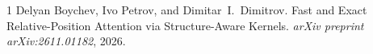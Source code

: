 \documentclass[11pt,a4paper]{article}
\begin{document}

\begin{thebibliography}{1}
Delyan Boychev, Ivo Petrov, and Dimitar~I.\ Dimitrov.
\newblock Fast and Exact Relative-Position Attention via Structure-Aware Kernels.
\newblock \emph{arXiv preprint arXiv:2611.01182}, 2026.
\end{thebibliography}
\end{document}
